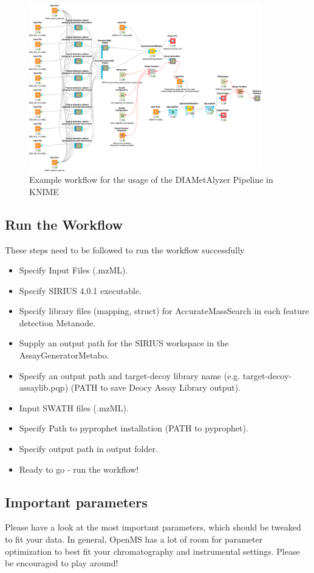 \begin{figure}[!h]
  \centering
  \includegraphics[width=0.9\textwidth]{graphics/openswathmetabo/example_wf.png}
  \caption{Example workflow for the usage of the DIAMetAlyzer Pipeline in KNIME}
  \label{fig:oswm_example_wf}
\end{figure}

\subsection{Run the Workflow}
These steps need to be followed to run the workflow successfully

\begin{itemize}
\item Specify Input Files (.mzML).
\item Specify SIRIUS 4.0.1 executable.
\item Specify library files (mapping, struct) for AccurateMassSearch in each feature detection Metanode.
\item Supply an output path for the SIRIUS workspace in the AssayGeneratorMetabo.
\item Specify an output path and target-decoy library name (e.g. target-decoy-assaylib.pqp) (PATH to save Deocy Assay Library output).
\item Input SWATH files (.mzML).
\item Specify Path to pyprophet installation (PATH to pyprophet).
\item Specify output path in output folder.
\item Ready to go - run the workflow! 
\end{itemize}

\subsection{Important parameters}
\noindent Please have a look at the most important parameters, which should be tweaked to fit your data. In general, OpenMS has a lot of room for parameter optimization to best fit your chromatography and instrumental settings. Please be encouraged to play around!  \\

